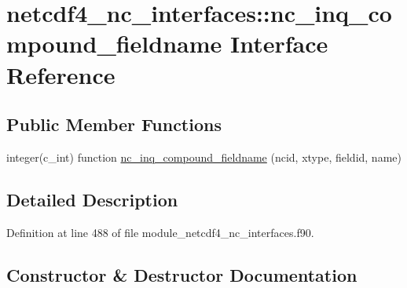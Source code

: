 \hypertarget{interfacenetcdf4__nc__interfaces_1_1nc__inq__compound__fieldname}{}\section{netcdf4\+\_\+nc\+\_\+interfaces\+:\+:nc\+\_\+inq\+\_\+compound\+\_\+fieldname Interface Reference}
\label{interfacenetcdf4__nc__interfaces_1_1nc__inq__compound__fieldname}
\subsection*{Public Member Functions}
\begin{DoxyCompactItemize}
\item 
integer(c\+\_\+int) function \hyperlink{interfacenetcdf4__nc__interfaces_1_1nc__inq__compound__fieldname_ad93fc99a4c4e73605a24c152e27f252d}{nc\+\_\+inq\+\_\+compound\+\_\+fieldname} (ncid, xtype, fieldid, name)
\end{DoxyCompactItemize}


\subsection{Detailed Description}


Definition at line 488 of file module\+\_\+netcdf4\+\_\+nc\+\_\+interfaces.\+f90.



\subsection{Constructor \& Destructor Documentation}
\mbox{\label{interfacenetcdf4__nc__interfaces_1_1nc__inq__compound__fieldname_ad93fc99a4c4e73605a24c152e27f252d}} 
